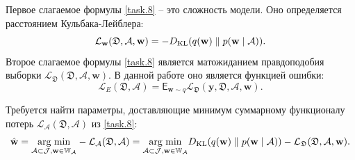 Первое слагаемое формулы \ref{task.8} -- это сложность модели. Оно определяется расстоянием Кульбака-Лейблера:
\begin{equation} \label{task.9}
\mathcal{L}_{\mathbf{w}}(\mathfrak{D}, \mathcal{A}, \mathbf{w}) = -D_{\operatorname{KL}}(q(\mathbf{w}) \parallel p(\mathbf{w} \mid \mathcal{A})).
\end{equation}
Второе слагаемое формулы \ref{task.8} является матожиданием правдоподобия выборки $\mathcal{L}_{\mathfrak{D}}(\mathfrak{D}, \mathcal{A}, \mathbf{w})$. В данной работе оно является функцией ошибки:
\begin{equation} \label{task.10}
\mathcal{L}_{E}(\mathfrak{D}, \mathcal{A}) = \mathsf{E}_{\mathbf{w} \sim q} \mathcal{L}_{\mathfrak{D}}(\mathbf{y}, \mathfrak{D}, \mathcal{A}, \mathbf{w}).
\end{equation}

Требуется найти параметры, доставляющие минимум суммарному функционалу потерь $\mathcal{L}_{\mathcal{A}}(\mathfrak{D}, \mathcal{A})$ из \ref{task.8}:
\begin{equation} \label{task.11}
\hat{\mathbf{w}} = \underset{\mathcal{A} \subset \mathcal{J}, \mathbf{w \in \mathbb{W}_{\mathcal{A}}}} {\operatorname{arg \hspace{3pt} min}} - \mathcal{L}_{\mathcal{A}}(\mathfrak{D}, \mathcal{A}) = \underset{\mathcal{A} \subset \mathcal{J}, \mathbf{w \in \mathbb{W}_{\mathcal{A}}}} {\operatorname{arg \hspace{3pt} min}} D_{\operatorname{KL}}(q(\mathbf{w}) \parallel p(\mathbf{w} \mid \mathcal{A})) - \mathcal{L}_{\mathfrak{D}}(\mathfrak{D}, \mathcal{A}, \mathbf{w}).
\end{equation}

